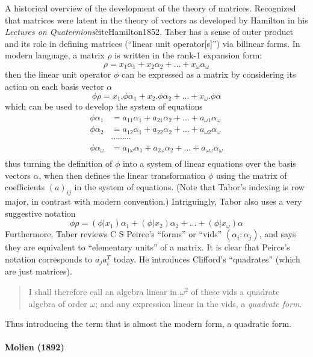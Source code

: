 A historical overview of the development of the theory of matrices.
Recognized that matrices were latent in the theory of vectors as developed by Hamilton in his \textit{Lectures on Quaternions}\~cite{Hamilton1852}.
Taber has a sense of outer product and its role in defining matrices (``linear unit operator[s]'') via bilinear forms. In modern language,
a matrix $\rho$ is written in the rank-1 expansion form:
\[
\rho = x_1 \alpha_1 + x_2 \alpha_2 + \dots + x_\omega \alpha_\omega
\]
then the linear unit operator $\phi$ can be expressed as a matrix by considering its action on each basis vector $\alpha$
\[
\phi\rho = x_1.\phi\alpha_1 + x_2.\phi\alpha_2 + \dots + x_\omega.\phi\alpha
\]
which can be used to develop the system of equations
\begin{align}
\phi \alpha_1 & = a_{11} \alpha_1 + a_{21} \alpha_2 + \dots + a_{\omega 1} \alpha_\omega \\
\phi \alpha_2 & = a_{12} \alpha_1 + a_{22} \alpha_2 + \dots + a_{\omega 2} \alpha_\omega \\
              & \cdots \cdots \cdots \\
\phi \alpha_\omega & = a_{1\omega} \alpha_1 + a_{2\omega} \alpha_2 + \dots + a_{\omega \omega} \alpha_\omega \\
\end{align}
thus turning the definition of $\phi$ into a system of linear equations over the basis vectors $\alpha$, when then defines the linear transformation $\phi$ using the matrix of coefficients $(a)_{ij}$ in the system of equations.
(Note that Tabor's indexing is row major, in contrast with modern convention.)
Intriguingly, Tabor also uses a very suggestive notation
\[
\phi\rho = (\phi|x_1)\alpha_1 + (\phi|x_2)\alpha_2 + \dots + (\phi|x_\omega)\alpha
\]
Furthermore, Taber reviews C S Peirce's ``forms'' or ``vids'' $(\alpha_i : \alpha_j)$, and says they are equivalent to ``elementary units'' of a matrix. It is clear fhat Peirce's notation corresponds to $a_j a_i^T$ today.
He introduces Clifford's ``quadrates'' (which are just matrices).
\begin{quote}
I shall therefore call an algebra linear in $\omega^2$ of these vids a quadrate algebra of order $\omega$; and any expression linear in the vids, a \textit{quadrate form}.
\end{quote}
Thus introducing the term that is almost the modern form, a quadratic form.

\paragraph{Molien (1892)~\cite{Molien1892}}


